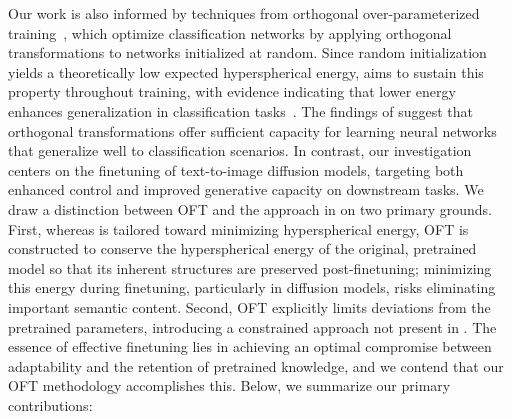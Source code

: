 Our work is also informed by techniques from orthogonal over-parameterized training~\cite{liu2021orthogonal}, which optimize classification networks by applying orthogonal transformations to networks initialized at random. Since random initialization yields a theoretically low expected hyperspherical energy, \cite{liu2021orthogonal} aims to sustain this property throughout training, with evidence indicating that lower energy enhances generalization in classification tasks~\cite{liu2018learning,lin2020regularizing}. The findings of \cite{liu2021orthogonal} suggest that orthogonal transformations offer sufficient capacity for learning neural networks that generalize well to classification scenarios. In contrast, our investigation centers on the finetuning of text-to-image diffusion models, targeting both enhanced control and improved generative capacity on downstream tasks. We draw a distinction between OFT and the approach in \cite{liu2021orthogonal} on two primary grounds. First, whereas \cite{liu2021orthogonal} is tailored toward minimizing hyperspherical energy, OFT is constructed to conserve the hyperspherical energy of the original, pretrained model so that its inherent structures are preserved post-finetuning; minimizing this energy during finetuning, particularly in diffusion models, risks eliminating important semantic content. Second, OFT explicitly limits deviations from the pretrained parameters, introducing a constrained approach not present in \cite{liu2021orthogonal}. The essence of effective finetuning lies in achieving an optimal compromise between adaptability and the retention of pretrained knowledge, and we contend that our OFT methodology accomplishes this. Below, we summarize our primary contributions:

